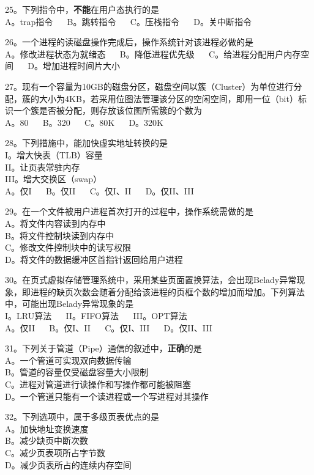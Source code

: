 25。下列指令中，\textbf{不能}在用户态执行的是 \\
A。trap指令 $\quad$ B。跳转指令 $\quad$ C。压栈指令 $\quad$ D。关中断指令

26。一个进程的读磁盘操作完成后，操作系统针对该进程必做的是 \\
A。修改进程状态为就绪态 $\quad$ B。降低进程优先级 $\quad$ C。给进程分配用户内存空间 $\quad$ D。增加进程时间片大小

27。现有一个容量为10GB的磁盘分区，磁盘空间以簇（Cluster）为单位进行分配，簇的大小为4KB，若采用位图法管理该分区的空闲空间，即用一位（bit）标识一个簇是否被分配，则存放该位图所需簇的个数为 \\
A。80 $\quad$ B。320 $\quad$ C。80K $\quad$ D。320K

28。下列措施中，能加快虚实地址转换的是 \\
I。增大快表（TLB）容量 \\
II。让页表常驻内存 \\
III。增大交换区（swap） \\
A。仅I $\quad$ B。仅II $\quad$ C。仅I、II $\quad$ D。仅II、III

29。在一个文件被用户进程首次打开的过程中，操作系统需做的是 \\
A。将文件内容读到内存中 \\
B。将文件控制块读到内存中 \\
C。修改文件控制块中的读写权限 \\
D。将文件的数据缓冲区首指针返回给用户进程

30。在页式虚拟存储管理系统中，采用某些页面置换算法，会出现Belady异常现象，即进程的缺页次数会随着分配给该进程的页框个数的增加而增加。下列算法中，可能出现Belady异常现象的是 \\
I。LRU算法 $\quad$ II。FIFO算法 $\quad$ III。OPT算法 \\
A。仅II $\quad$ B。仅I、II $\quad$ C。仅I、III $\quad$ D。仅II、III

31。下列关于管道（Pipe）通信的叙述中，\textbf{正确}的是 \\
A。一个管道可实现双向数据传输 \\
B。管道的容量仅受磁盘容量大小限制 \\
C。进程对管道进行读操作和写操作都可能被阻塞 \\
D。一个管道只能有一个读进程或一个写进程对其操作

32。下列选项中，属于多级页表优点的是 \\
A。加快地址变换速度 \\
B。减少缺页中断次数 \\
C。减少页表项所占字节数 \\
D。减少页表所占的连续内存空间

